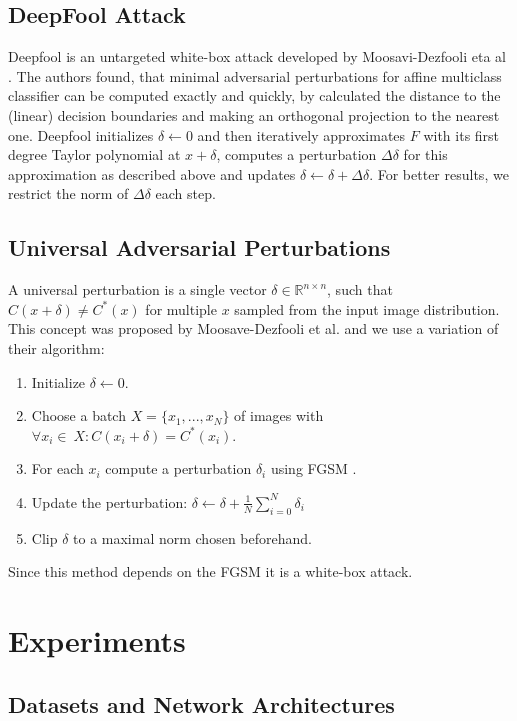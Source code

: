 \documentclass{article}
\begin{document}
\subsection{DeepFool Attack}
Deepfool is an untargeted white-box attack developed by Moosavi-Dezfooli eta al \cite{deepfool}.
The authors found, that minimal adversarial perturbations for affine multiclass classifier can be computed exactly and quickly,
by calculated the distance to the (linear) decision boundaries and making an orthogonal projection to the nearest one.
Deepfool initializes $\delta \gets 0$ and then iteratively approximates $F$ with its first degree Taylor polynomial at $x + \delta$, computes a perturbation $\Delta \delta$ for this approximation as described above and updates $\delta \gets \delta + \Delta \delta$.
For better results, we restrict the norm of $\Delta \delta$ each step.

\subsection{Universal Adversarial Perturbations}
A universal perturbation is a single vector $\delta \in \mathbb{R}^{n\times n}$, such that $C(x + \delta) \neq C^*(x)$ for multiple $x$ sampled from the input image distribution. This concept was proposed by Moosave-Dezfooli et al. \cite{universal} and we use a variation of their algorithm:
\begin{enumerate}
	\item Initialize $\delta \gets 0$.
	\item Choose a batch $X = \{x_1, ..., x_N\}$ of images with $\forall x_i \in\ X:  C(x_i + \delta) = C^*(x_i)$.
	\item For each $x_i$ compute a perturbation $\delta_i$ using FGSM \cite{fgsm}.
	\item Update the perturbation: $\delta \gets \delta + \frac{1}{N} \sum\limits_{i=0}^N \delta_i$
	\item Clip $\delta$ to a maximal norm chosen beforehand.
\end{enumerate}
Since this method depends on the FGSM \cite{fgsm} it is a white-box attack.


\section{Experiments}
\label{lab:experiments}

\subsection{Datasets and Network Architectures}
\end{document}
